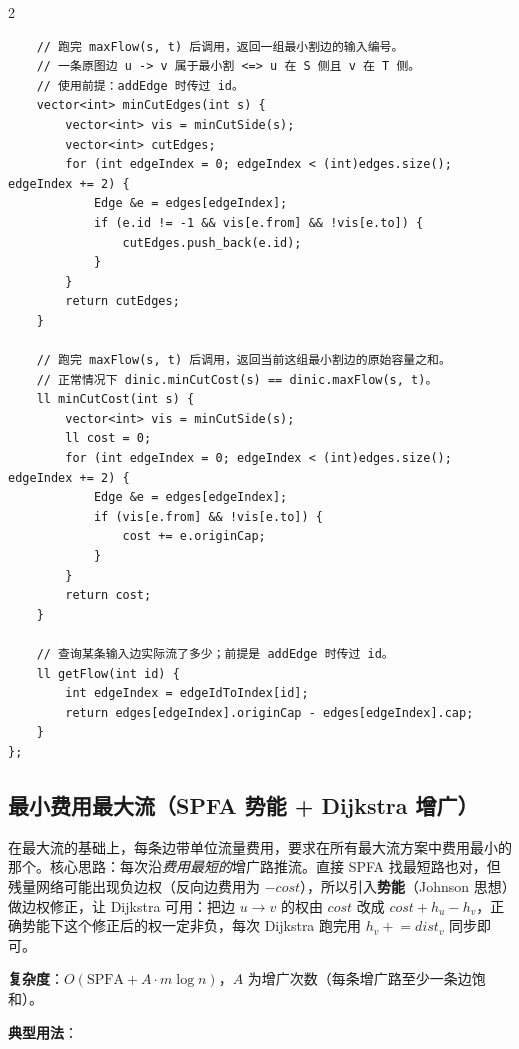 \begin{multicols*}{2}
\begin{verbatim}
    // 跑完 maxFlow(s, t) 后调用，返回一组最小割边的输入编号。
    // 一条原图边 u -> v 属于最小割 <=> u 在 S 侧且 v 在 T 侧。
    // 使用前提：addEdge 时传过 id。
    vector<int> minCutEdges(int s) {
        vector<int> vis = minCutSide(s);
        vector<int> cutEdges;
        for (int edgeIndex = 0; edgeIndex < (int)edges.size(); edgeIndex += 2) {
            Edge &e = edges[edgeIndex];
            if (e.id != -1 && vis[e.from] && !vis[e.to]) {
                cutEdges.push_back(e.id);
            }
        }
        return cutEdges;
    }

    // 跑完 maxFlow(s, t) 后调用，返回当前这组最小割边的原始容量之和。
    // 正常情况下 dinic.minCutCost(s) == dinic.maxFlow(s, t)。
    ll minCutCost(int s) {
        vector<int> vis = minCutSide(s);
        ll cost = 0;
        for (int edgeIndex = 0; edgeIndex < (int)edges.size(); edgeIndex += 2) {
            Edge &e = edges[edgeIndex];
            if (vis[e.from] && !vis[e.to]) {
                cost += e.originCap;
            }
        }
        return cost;
    }

    // 查询某条输入边实际流了多少；前提是 addEdge 时传过 id。
    ll getFlow(int id) {
        int edgeIndex = edgeIdToIndex[id];
        return edges[edgeIndex].originCap - edges[edgeIndex].cap;
    }
};
		\end{verbatim}


		\subsection{最小费用最大流（SPFA 势能 + Dijkstra 增广）}

		在最大流的基础上，每条边带单位流量费用，要求在所有最大流方案中费用最小的那个。核心思路：每次沿\emph{费用最短的}增广路推流。直接 SPFA 找最短路也对，但残量网络可能出现负边权（反向边费用为 $-cost$），所以引入\textbf{势能}（Johnson 思想）做边权修正，让 Dijkstra 可用：把边 $u\to v$ 的权由 $cost$ 改成 $cost + h_u - h_v$，正确势能下这个修正后的权一定非负，每次 Dijkstra 跑完用 $h_v \mathrel{+}= dist_v$ 同步即可。

		\textbf{复杂度}：$O(\text{SPFA} + A \cdot m \log n)$，$A$ 为增广次数（每条增广路至少一条边饱和）。

		\textbf{典型用法}：


\end{multicols*}
